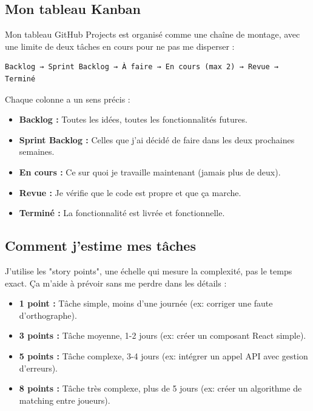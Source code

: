 \subsection{Mon tableau Kanban}

Mon tableau GitHub Projects est organisé comme une chaîne de montage, avec une limite de deux tâches en cours pour ne pas me disperser :

\begin{verbatim}
Backlog → Sprint Backlog → À faire → En cours (max 2) → Revue → Terminé
\end{verbatim}

Chaque colonne a un sens précis :
\begin{itemize}
    \item \textbf{Backlog :} Toutes les idées, toutes les fonctionnalités futures.
    \item \textbf{Sprint Backlog :} Celles que j'ai décidé de faire dans les deux prochaines semaines.
    \item \textbf{En cours :} Ce sur quoi je travaille maintenant (jamais plus de deux).
    \item \textbf{Revue :} Je vérifie que le code est propre et que ça marche.
    \item \textbf{Terminé :} La fonctionnalité est livrée et fonctionnelle.
\end{itemize}

\subsection{Comment j'estime mes tâches}

J'utilise les "story points", une échelle qui mesure la complexité, pas le temps exact. Ça m'aide à prévoir sans me perdre dans les détails :

\begin{itemize}
    \item \textbf{1 point :} Tâche simple, moins d'une journée (ex: corriger une faute d'orthographe).
    \item \textbf{3 points :} Tâche moyenne, 1-2 jours (ex: créer un composant React simple).
    \item \textbf{5 points :} Tâche complexe, 3-4 jours (ex: intégrer un appel API avec gestion d'erreurs).
    \item \textbf{8 points :} Tâche très complexe, plus de 5 jours (ex: créer un algorithme de matching entre joueurs).
\end{itemize}

